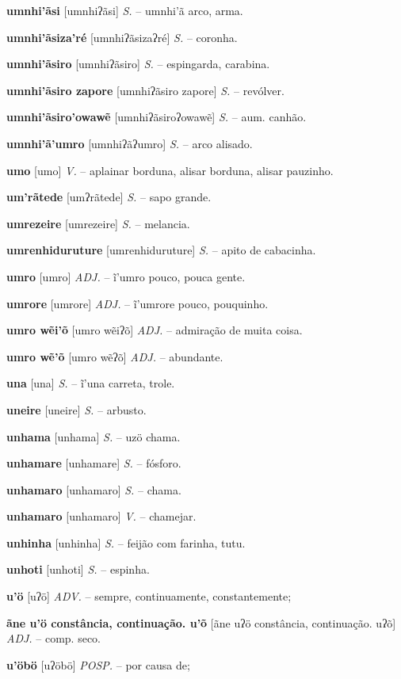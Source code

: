 \textbf{umnhi'ãsi} [umnhiʔãsi] \textit{S.} -- umnhi'ã arco, arma.

\textbf{umnhi'ãsiza'ré} [umnhiʔãsizaʔré] \textit{S.} -- coronha.

\textbf{umnhi'ãsiro} [umnhiʔãsiro] \textit{S.} -- espingarda, carabina.

\textbf{umnhi'ãsiro zapore} [umnhiʔãsiro zapore] \textit{S.} -- revólver.

\textbf{umnhi'ãsiro'owawẽ} [umnhiʔãsiroʔowawẽ] \textit{S.} -- aum. canhão.

\textbf{umnhi'ã'umro} [umnhiʔãʔumro] \textit{S.} -- arco alisado.

\textbf{umo} [umo] \textit{V.} -- aplainar borduna, alisar borduna, alisar pauzinho.

\textbf{um'rãtede} [umʔrãtede] \textit{S.} -- sapo grande.

\textbf{umrezeire} [umrezeire] \textit{S.} -- melancia.

\textbf{umrenhiduruture} [umrenhiduruture] \textit{S.} -- apito de cabacinha.

\textbf{umro} [umro] \textit{ADJ.} -- ĩ'umro pouco, pouca gente.

\textbf{umrore} [umrore] \textit{ADJ.} -- ĩ'umrore pouco, pouquinho.

\textbf{umro wẽi'õ} [umro wẽiʔõ] \textit{ADJ.} -- admiração de muita coisa.

\textbf{umro wẽ'õ} [umro wẽʔõ] \textit{ADJ.} -- abundante.

\textbf{una} [una] \textit{S.} -- ĩ'una carreta, trole.

\textbf{uneire} [uneire] \textit{S.} -- arbusto.

\textbf{unhama} [unhama] \textit{S.} -- uzö chama.

\textbf{unhamare} [unhamare] \textit{S.} -- fósforo.

\textbf{unhamaro} [unhamaro] \textit{S.} -- chama.

\textbf{unhamaro} [unhamaro] \textit{V.} -- chamejar.

\textbf{unhinha} [unhinha] \textit{S.} -- feijão com farinha, tutu.

\textbf{unhoti} [unhoti] \textit{S.} -- espinha.

\textbf{u'ö} [uʔö] \textit{ADV.} -- sempre, continuamente, constantemente;

\textbf{ãne u'ö constância, continuação. u'õ} [ãne uʔö constância, continuação. uʔõ] \textit{ADJ.} -- comp. seco.

\textbf{u'öbö} [uʔöbö] \textit{POSP.} -- por causa de;

